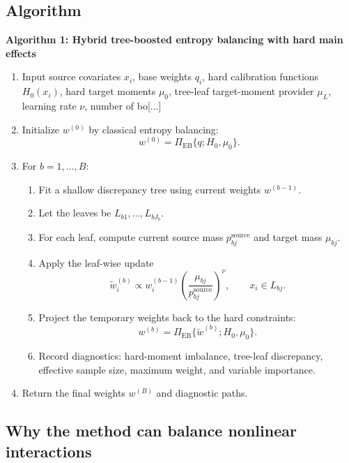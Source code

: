 \documentclass[11pt]{article}
\begin{document}
{\subsection{Algorithm}

\textbf{Algorithm 1: Hybrid tree-boosted entropy balancing with hard main effects}

\begin{enumerate}[leftmargin=2em]
\item Input source covariates $x_i$, base weights $q_i$, hard calibration functions $H_0(x_i)$, hard target moments $\mu_0$, tree-leaf target-moment provider $\mu_L$, learning rate $\nu$, number of bo[...]
\item Initialize $w^{(0)}$ by classical entropy balancing:
\begin{equation*}
w^{(0)}=\Pi_{\mathrm{EB}}\{q;H_0,\mu_0\}.
\end{equation*}
\item For $b=1,\ldots,B$:
\begin{enumerate}[leftmargin=2em]
\item Fit a shallow discrepancy tree using current weights $w^{(b-1)}$.
\item Let the leaves be $L_{b1},\ldots,L_{bJ_b}$.
\item For each leaf, compute current source mass $p_{bj}^{\mathrm{source}}$ and target mass $\mu_{bj}$.
\item Apply the leaf-wise update
\begin{equation*}
\widetilde w_i^{(b)}
\propto
w_i^{(b-1)}
\left(\frac{\mu_{bj}}{p_{bj}^{\mathrm{source}}}\right)^\nu,
\qquad x_i\in L_{bj}.
\end{equation*}
\item Project the temporary weights back to the hard constraints:
\begin{equation*}
w^{(b)}=\Pi_{\mathrm{EB}}\{\widetilde w^{(b)};H_0,\mu_0\}.
\end{equation*}
\item Record diagnostics: hard-moment imbalance, tree-leaf discrepancy, effective sample size, maximum weight, and variable importance.
\end{enumerate}
\item Return the final weights $w^{(B)}$ and diagnostic paths.
\end{enumerate}

\subsection{Why the method can balance nonlinear interactions}

}
\end{document}
